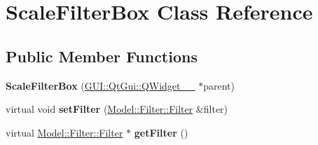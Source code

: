 \hypertarget{classGUI_1_1ScaleFilterBox}{}\section{Scale\+Filter\+Box Class Reference}
\label{classGUI_1_1ScaleFilterBox}
\subsection*{Public Member Functions}
\begin{DoxyCompactItemize}
\item 
\hypertarget{classGUI_1_1ScaleFilterBox_a592dac49a075951534941db24566672c}{}{\bfseries Scale\+Filter\+Box} (\hyperlink{classGUI_1_1QtGui_1_1QWidget____10}{G\+U\+I\+::\+Qt\+Gui\+::\+Q\+Widget\+\_\+\+\_} $\ast$parent)\label{classGUI_1_1ScaleFilterBox_a592dac49a075951534941db24566672c}

\item 
\hypertarget{classGUI_1_1ScaleFilterBox_ad7c0ee00fe3faac7942d75eec2a5342b}{}virtual void {\bfseries set\+Filter} (\hyperlink{classModel_1_1Filter_1_1Filter}{Model\+::\+Filter\+::\+Filter} \&filter)\label{classGUI_1_1ScaleFilterBox_ad7c0ee00fe3faac7942d75eec2a5342b}

\item 
\hypertarget{classGUI_1_1ScaleFilterBox_acef2029a93f4ab3a538cdb643b9c2613}{}virtual \hyperlink{classModel_1_1Filter_1_1Filter}{Model\+::\+Filter\+::\+Filter} $\ast$ {\bfseries get\+Filter} ()\label{classGUI_1_1ScaleFilterBox_acef2029a93f4ab3a538cdb643b9c2613}

\end{DoxyCompactItemize}

